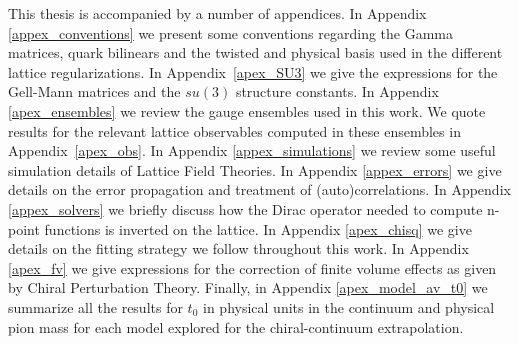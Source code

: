 This thesis is accompanied by a number of appendices. In Appendix \ref{appex_conventions} we present some conventions regarding the Gamma matrices, quark bilinears and the twisted and physical basis used in the different lattice regularizations. In Appendix~\ref{apex_SU3} we give the expressions for the Gell-Mann matrices and the $su(3)$ structure constants. In Appendix \ref{apex_ensembles} we review the gauge ensembles used in this work. We quote results for the relevant lattice observables computed in these ensembles in Appendix~\ref{apex_obs}. In Appendix \ref{appex_simulations} we review some useful simulation details of Lattice Field Theories. In Appendix \ref{appex_errors} we give details on the error propagation and treatment of (auto)correlations. In Appendix \ref{appex_solvers} we briefly discuss how the Dirac operator needed to compute n-point functions is inverted on the lattice. In Appendix \ref{apex_chisq} we give details on the fitting strategy we follow throughout this work. In Appendix \ref{apex_fv} we give expressions for the correction of finite volume effects as given by Chiral Perturbation Theory. Finally, in Appendix \ref{apex_model_av_t0} we summarize all the results for $t_0$ in physical units in the continuum and physical pion mass for each model explored for the chiral-continuum extrapolation.

